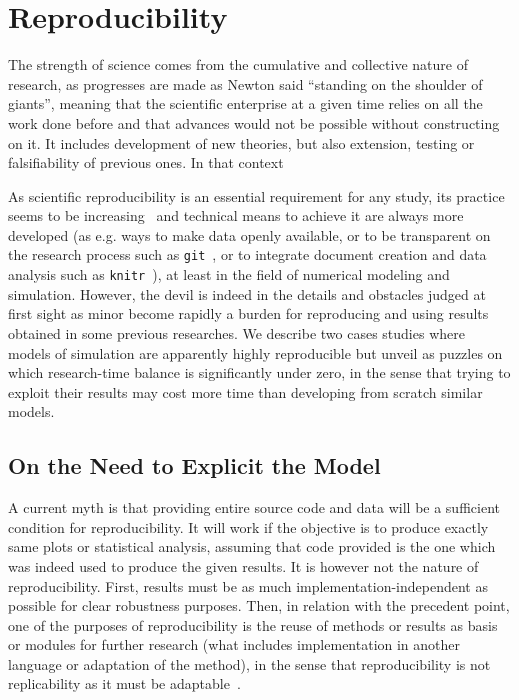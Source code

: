 \newpage



\section{Reproducibility}




The strength of science comes from the cumulative and collective nature of research, as progresses are made as Newton said ``standing on the shoulder of giants'', meaning that the scientific enterprise at a given time relies on all the work done before and that advances would not be possible without constructing on it. It includes development of new theories, but also extension, testing or falsifiability of previous ones. In that context 





As scientific reproducibility is an essential requirement for any study, its practice seems to be increasing~\cite{stodden2010scientific} and technical means to achieve it are always more developed (as e.g. ways to make data openly available, or to be transparent on the research process such as \texttt{git}~\cite{ram2013git}, or to integrate document creation and data analysis such as \texttt{knitr}~\cite{xie2013knitr}), at least in the field of numerical modeling and simulation. However, the devil is indeed in the details and obstacles judged at first sight as minor become rapidly a burden for reproducing and using results obtained in some previous researches. We describe two cases studies where models of simulation are apparently highly reproducible but unveil as puzzles on which research-time balance is significantly under zero, in the sense that trying to exploit their results may cost more time than developing from scratch similar models.






\subsection{On the Need to Explicit the Model}

A current myth is that providing entire source code and data will be a sufficient condition for reproducibility. It will work if the objective is to produce exactly same plots or statistical analysis, assuming that code provided is the one which was indeed used to produce the given results. It is however not the nature of reproducibility. First, results must be as much implementation-independent as possible for clear robustness purposes. Then, in relation with the precedent point, one of the purposes of reproducibility is the reuse of methods or results as basis or modules for further research (what includes implementation in another language or adaptation of the method), in the sense that reproducibility is not replicability as it must be adaptable~\cite{drummond2009replicability}.

